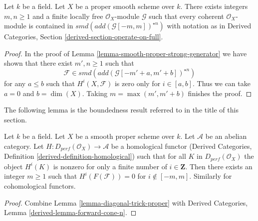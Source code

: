 \begin{lemma}
\label{lemma-diagonal-trick-proper}
Let $k$ be a field. Let $X$ be a proper smooth scheme over $k$.
There exists integers $m, n \geq 1$ and a finite locally free
$\mathcal{O}_X$-module $\mathcal{G}$ such that every coherent
$\mathcal{O}_X$-module is contained in $smd(add(\mathcal{G}[-m, m])^{\star n})$
with notation as in Derived Categories, Section
\ref{derived-section-operate-on-full}.
\end{lemma}

\begin{proof}
In the proof of Lemma \ref{lemma-smooth-proper-strong-generator}
we have shown that there exist $m', n \geq 1$ such that
$$
\mathcal{F} \in smd(add(\mathcal{G}[-m' + a, m' + b])^{\star n})
$$
for any $a \leq b$ such that $H^i(X, \mathcal{F})$ is zero only
for $i \in [a, b]$. Thus we can take $a = 0$ and $b = \dim(X)$.
Taking $m = \max(m', m' + b)$ finishes the proof.
\end{proof}

\noindent
The following lemma is the boundedness result referred to
in the title of this section.

\begin{lemma}
\label{lemma-boundedness}
Let $k$ be a field. Let $X$ be a smooth proper scheme over $k$.
Let $\mathcal{A}$ be an abelian category. Let
$H : D_{perf}(\mathcal{O}_X) \to \mathcal{A}$ be a homological
functor (Derived Categories, Definition \ref{derived-definition-homological})
such that for all $K$ in $D_{perf}(\mathcal{O}_X)$ the object
$H^i(K)$ is nonzero for only a finite number of $i \in \mathbf{Z}$.
Then there exists an integer $m \geq 1$ such that
$H^i(F(\mathcal{F})) = 0$ for $i \not \in [-m, m]$.
Similarly for cohomological functors.
\end{lemma}

\begin{proof}
Combine Lemma \ref{lemma-diagonal-trick-proper} with
Derived Categories, Lemma \ref{derived-lemma-forward-cone-n}.
\end{proof}

